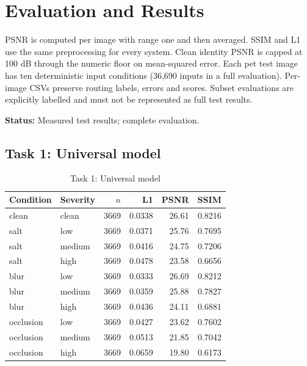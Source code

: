 \documentclass[conference]{IEEEtran}
\newcommand{\statusnote}[1]{\par\smallskip\noindent\textbf{Status:} #1\par\smallskip}
\begin{document}
\section{Evaluation and Results}
PSNR is computed per image with range one and then averaged. SSIM and L1 use
the same preprocessing for every system. Clean identity PSNR is capped at
100 dB through the numeric floor on mean-squared error. Each pet test image has
ten deterministic input conditions (36,690 inputs in a full evaluation).
Per-image CSVs preserve routing labels, errors and scores. Subset evaluations
are explicitly labelled and must not be represented as full test results.
\statusnote{Measured test results; complete evaluation.}

\subsection{Task 1: Universal model}

\begin{table}[!ht]\centering\caption{Task 1: Universal model}\scriptsize

\begin{tabular}{llrrrr}\toprule Condition & Severity & $n$ & L1 & PSNR & SSIM\\\midrule

clean & clean & 3669 & 0.0338 & 26.61 & 0.8216\\

salt & low & 3669 & 0.0371 & 25.76 & 0.7695\\

salt & medium & 3669 & 0.0416 & 24.75 & 0.7206\\

salt & high & 3669 & 0.0478 & 23.58 & 0.6656\\

blur & low & 3669 & 0.0333 & 26.69 & 0.8212\\

blur & medium & 3669 & 0.0359 & 25.88 & 0.7827\\

blur & high & 3669 & 0.0436 & 24.11 & 0.6881\\

occlusion & low & 3669 & 0.0427 & 23.62 & 0.7602\\

occlusion & medium & 3669 & 0.0513 & 21.85 & 0.7042\\

occlusion & high & 3669 & 0.0659 & 19.80 & 0.6173\\

\bottomrule\end{tabular}\end{table}
\end{document}
